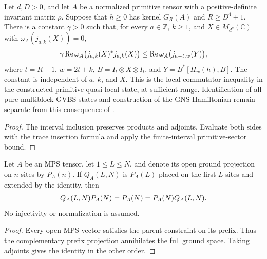 \begin{lemma}
    \label{thm:primitive_quasi_local_parent_commutator_gap}
    \leanok
    Let $d,D>0$, and let $A$ be a normalized primitive tensor with a
    positive-definite invariant matrix $\rho$. Suppose that $h\geq0$ has
    kernel $G_R(A)$ and $R\geq D^4+1$. There is a constant $\gamma>0$
    such that, for every $a\in\mathbb Z$, $k\geq1$, and
    $X\in M_{d^k}(\mathbb C)$ with $\omega_A(j_{a,k}(X))=0$,
    \begin{align}
        \gamma\operatorname{Re}\omega_A\bigl(j_{a,k}(X)^*j_{a,k}(X)\bigr)
        \leq \operatorname{Re}\omega_A\bigl(j_{a-t,w}(Y)\bigr),
        \notag
    \end{align}
    where $t=R-1$, $w=2t+k$, $B=I_t\otimes X\otimes I_t$, and
    $Y=B^*[H_w(h),B]$. The constant is independent of $a$, $k$, and $X$.
    This is the local commutator inequality in the constructed primitive
    quasi-local state, at sufficient range. Identification of all pure
    multiblock GVBS states and construction of the GNS Hamiltonian remain
    separate from this consequence of
    \cite[Theorem~1.2 and Section~6]{Nachtergaele1996Spectral}.
\end{lemma}
\begin{proof}\leanok
    The interval inclusion preserves products and adjoints. Evaluate both
    sides with the trace insertion formula and apply the finite-interval
    primitive-sector bound.
\end{proof}

\begin{lemma}
    \label{thm:ground_prefix_projection_identity}
    \leanok
    Let $A$ be an MPS tensor, let $1\leq L\leq N$, and denote its open
    ground projection on $n$ sites by $P_A(n)$. If $Q_A(L,N)$ is $P_A(L)$
    placed on the first $L$ sites and extended by the identity, then
    \begin{align}
        Q_A(L,N)P_A(N)=P_A(N)=P_A(N)Q_A(L,N).
        \notag
    \end{align}
    No injectivity or normalization is assumed.
\end{lemma}
\begin{proof}\leanok
    Every open MPS vector satisfies the parent constraint on its prefix.
    Thus the complementary prefix projection annihilates the full ground
    space. Taking adjoints gives the identity in the other order.
\end{proof}

